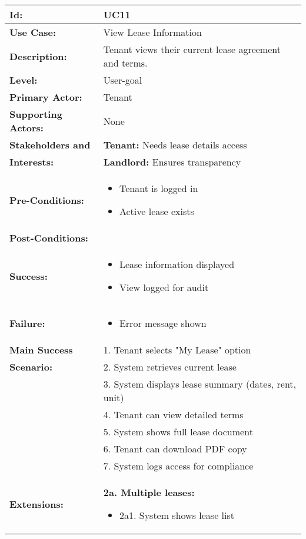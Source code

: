 \documentclass[12pt]{article}
\begin{document}
\begin{tabular}{|p{3cm}|p{11cm}|}
\hline
\textbf{Id:} & UC11 \\
\hline
\textbf{Use Case:} & View Lease Information \\
\hline
\textbf{Description:} & Tenant views their current lease agreement and terms. \\
\hline
\textbf{Level:} & User-goal \\
\hline
\textbf{Primary Actor:} & Tenant \\
\hline
\textbf{Supporting Actors:} & None \\
\hline
\textbf{Stakeholders and} & \textbf{Tenant:} Needs lease details access \\
\textbf{Interests:} & \textbf{Landlord:} Ensures transparency \\
\hline
\textbf{Pre-Conditions:} & 
\begin{itemize}
    \item Tenant is logged in
    \item Active lease exists
\end{itemize} \\
\hline
\textbf{Post-Conditions:} & \\
\textbf{Success:} & 
\begin{itemize}
    \item Lease information displayed
    \item View logged for audit
\end{itemize} \\
\textbf{Failure:} & 
\begin{itemize}
    \item Error message shown
\end{itemize} \\
\hline
\textbf{Main Success} & 1. Tenant selects "My Lease" option \\
\textbf{Scenario:} & 2. System retrieves current lease \\
& 3. System displays lease summary (dates, rent, unit) \\
& 4. Tenant can view detailed terms \\
& 5. System shows full lease document \\
& 6. Tenant can download PDF copy \\
& 7. System logs access for compliance \\
\hline
\textbf{Extensions:} & 
\textbf{2a. Multiple leases:}
\begin{itemize}
    \item 2a1. System shows lease list

\end{itemize}
\end{tabular}
\end{document}
